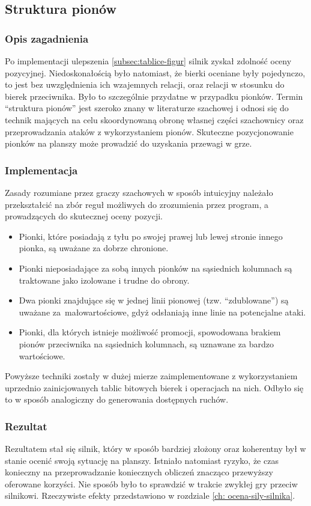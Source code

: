 \subsection{Struktura pionów}
\label{subsec:struktura-pionow}

\subsubsection{Opis zagadnienia}
Po implementacji ulepszenia \ref{subsec:tablice-figur} silnik zyskał zdolność oceny pozycyjnej.
Niedoskonałością było natomiast, że bierki oceniane były pojedynczo, to jest bez uwzględnienia ich wzajemnych relacji, oraz relacji w stosunku do bierek przeciwnika.
Było to szczególnie przydatne w przypadku pionków.
Termin \enquote{struktura pionów} jest szeroko znany w literaturze szachowej \cite*{stuktura-pionow} i odnosi się do technik mających na celu skoordynowaną obronę własnej części szachownicy oraz przeprowadzania ataków z wykorzystaniem pionów.
Skuteczne pozycjonowanie pionków na planszy może prowadzić do uzyskania przewagi w grze.

\subsubsection{Implementacja}
Zasady rozumiane przez graczy szachowych w sposób intuicyjny należało przekształcić na zbór reguł możliwych do zrozumienia przez program, a prowadzących do skutecznej oceny pozycji.
\begin{itemize}
    \item Pionki, które posiadają z tyłu po swojej prawej lub lewej stronie innego pionka, są uważane za dobrze chronione.
    \item Pionki nieposiadające za sobą innych pionków na sąsiednich kolumnach są traktowane jako izolowane i trudne do obrony.
    \item Dwa pionki znajdujące się w jednej linii pionowej (tzw. \enquote{zdublowane}) są uważane za~małowartościowe, gdyż odsłaniają inne linie na potencjalne ataki.
    \item Pionki, dla których istnieje możliwość promocji, spowodowana brakiem pionów przeciwnika na sąsiednich kolumnach, są uznawane za bardzo wartościowe.
\end{itemize}

Powyższe techniki zostały w dużej mierze zaimplementowane z wykorzystaniem uprzednio zainicjowanych tablic bitowych bierek i operacjach na nich.
Odbyło się to w sposób analogiczny do generowania dostępnych ruchów.

\subsubsection{Rezultat}
Rezultatem stał się silnik, który w sposób bardziej złożony oraz koherentny był w stanie ocenić swoją sytuację na planszy.
Istniało natomiast ryzyko, że czas konieczny na przeprowadzanie koniecznych obliczeń znacząco przewyższy oferowane korzyści.
Nie sposób było to sprawdzić w trakcie zwykłej gry przeciw silnikowi.
Rzeczywiste efekty przedstawiono w rozdziale \ref{ch: ocena-sily-silnika}.
